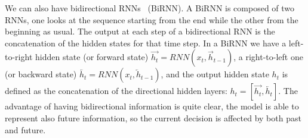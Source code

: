 

We can also have bidirectional RNNs~\citep{Schuster1997BiRNN} (BiRNN). A BiRNN is composed of two RNNs, one looks at the sequence starting from the end while the other from the beginning as usual. The output at each step of a bidirectional RNN is the concatenation of the hidden states for that time step. In a BiRNN we have a left-to-right hidden state (or forward state) $\overrightarrow{h_t} = RNN(x_t, \overrightarrow{h}_{t-1})$, a right-to-left one (or backward state) $\overleftarrow{h_t} = RNN(x_t, \overleftarrow{h}_{t-1})$, and the output hidden state $h_t$ is defined as the concatenation of the directional hidden layers: $h_t = [\overrightarrow{h_t}, \overleftarrow{h_t}]$. The advantage of having bidirectional information is quite clear, the model is able to represent also future information, so the current decision is affected by both past and future.

